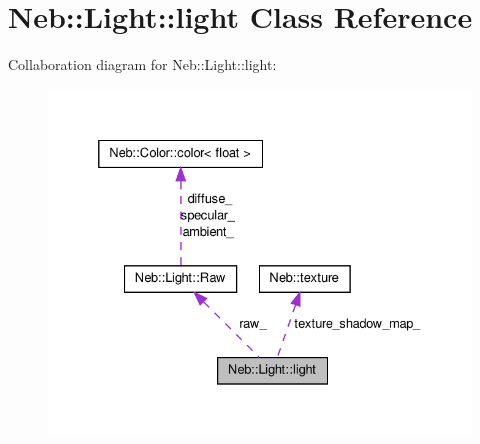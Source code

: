 \hypertarget{classNeb_1_1Light_1_1light}{\section{\-Neb\-:\-:\-Light\-:\-:light \-Class \-Reference}
\label{classNeb_1_1Light_1_1light}
}


\-Collaboration diagram for \-Neb\-:\-:\-Light\-:\-:light\-:\nopagebreak
\begin{figure}[H]
\begin{center}
\leavevmode
\includegraphics[width=332pt]{classNeb_1_1Light_1_1light__coll__graph}
\end{center}
\end{figure}
